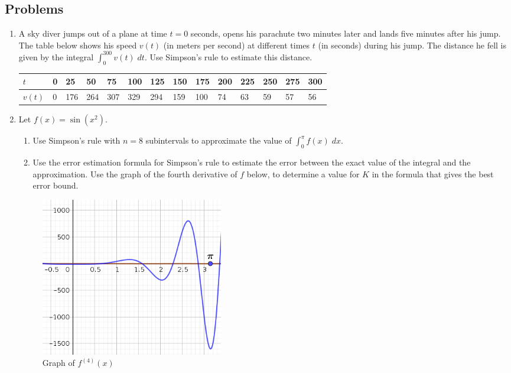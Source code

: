 \documentclass[12pt,letterpaper,fleqn]{article}
\begin{document}
\subsection*{Problems}
\begin{enumerate}
  \item A sky diver jumps out of a plane at time $t=0$ seconds, opens his parachute two minutes later and lands five minutes after his jump. The table below shows his speed $v(t)$ (in meters per second) at different times $t$ (in seconds) during his jump. The distance he fell is given by the integral $\int_0^{300} v(t)\;dt$. Use Simpson's rule to estimate this distance.
  \begin{table}[htbp]
    \centering
    \begin{tabularx}{0.8\textwidth}{| l | X | X | X | X | X | X | X | X | X | X | X | X | X| }
        \hline
        $t$ & 0 & 25 & 50 & 75 & 100 & 125 & 150 & 175 & 200 & 225 & 250 & 275 & 300\\ \hline
        $v(t)$ & 0 & 176 & 264 & 307 & 329 & 294 & 159 & 100 & 74 & 63 & 59 & 57 & 56\\ \hline
    \end{tabularx}
\end{table}
\newpage
    \item Let $f(x) = \sin(x^2)$.
	\begin{enumerate}
		\item Use Simpson's rule with $n = 8$ subintervals to approximate the value of $\int_0^\pi f(x)\;dx$.
		\item Use the error estimation formula for Simpson's rule to estimate the error between the exact value of the integral and the approximation. Use the graph of the fourth derivative of $f$ below, to determine a value for $K$ in the formula that gives the best error bound.
	\end{enumerate}
\begin{figure}[!htb]
	\centering
	\includegraphics[width=0.4\textwidth]{img/FourthDerivOfSin_x2.png}
	\caption{Graph of $f^{(4)}(x)$}
	\label{}
\end{figure}
\end{enumerate}
\end{document}
